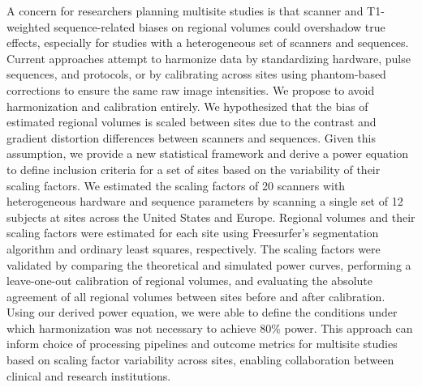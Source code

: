 
A concern for researchers planning multisite studies is that scanner and T1-weighted sequence-related biases on regional volumes could overshadow true effects, especially for studies with a heterogeneous set of scanners and sequences. Current approaches attempt to harmonize data by standardizing hardware, pulse sequences, and protocols, or by calibrating across sites using phantom-based corrections to ensure the same raw image intensities. We propose to avoid harmonization and calibration entirely.  We hypothesized that the bias of estimated regional volumes is scaled between sites due to the contrast and gradient distortion differences between scanners and sequences. Given this assumption, we provide a new statistical framework and derive a power equation to define inclusion criteria for a set of sites based on the variability of their scaling factors. We estimated the scaling factors of 20 scanners with heterogeneous hardware and sequence parameters by scanning a single set of 12 subjects at sites across the United States and Europe. Regional volumes and their scaling factors were estimated for each site using Freesurfer's segmentation algorithm and ordinary least squares, respectively. The scaling factors were validated by comparing the theoretical and simulated power curves, performing a leave-one-out calibration of regional volumes, and evaluating the absolute agreement of all regional volumes between sites before and after calibration. Using our derived power equation, we were able to define the conditions under which harmonization was not necessary to achieve 80\% power. This approach can inform choice of processing pipelines and outcome metrics for multisite studies based on scaling factor variability across sites, enabling collaboration between clinical and research institutions.